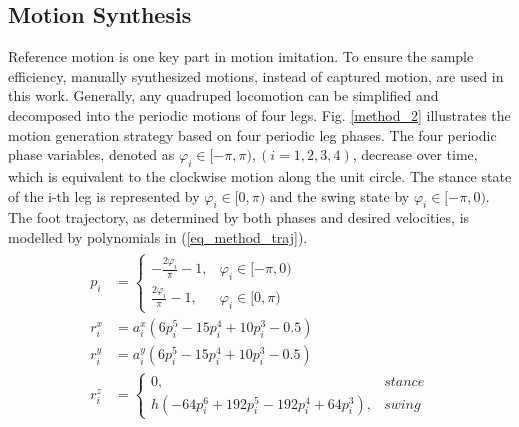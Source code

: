 \documentclass[letterpaper, 10 pt, journal, twoside]{IEEEtran} %
\begin{document}
\subsection{Motion Synthesis}
Reference motion is one key part in motion imitation. To ensure the sample efficiency, manually synthesized motions, instead of captured motion, are used in this work. Generally, any quadruped locomotion can be simplified and decomposed into the periodic motions of four legs. Fig. \ref{method_2} illustrates the motion generation strategy based on four periodic leg phases. The four periodic phase variables, denoted as $\varphi_i\in[-\pi,\pi), \left(i=1,2,3,4\right)$, decrease over time, which is equivalent to the clockwise motion along the unit circle. The stance state of the i-th leg is represented by $\varphi_i\in[0,\pi)$ and the swing state by $\varphi_i\in[-\pi,0)$. The foot trajectory, as determined by both phases and desired velocities, is modelled by polynomials in (\ref{eq_method_traj}).
\begin{eqnarray}
	\label{eq_method_traj}
	\begin{aligned}
		p_i &=
		\begin{cases}
			-\frac{2\varphi_i}{\pi}-1,&\varphi_i\in[-\pi,0) \\
			\frac{2\varphi_i}{\pi}-1,&\varphi_i\in[0,\pi)
		\end{cases} \\
		r^x_i &= a_i^x\left(6p_i^5-15p_i^4+10p_i^3-0.5\right) \\
		r^y_i &= a_i^y\left(6p_i^5-15p_i^4+10p_i^3-0.5\right) \\
		r^z_i &= 
		\begin{cases}
			0,&stance \\
			h(-64p_i^6+192p_i^5-192p_i^4+64p_i^3),&swing
		\end{cases}
	\end{aligned}
\end{eqnarray}
\end{document}
